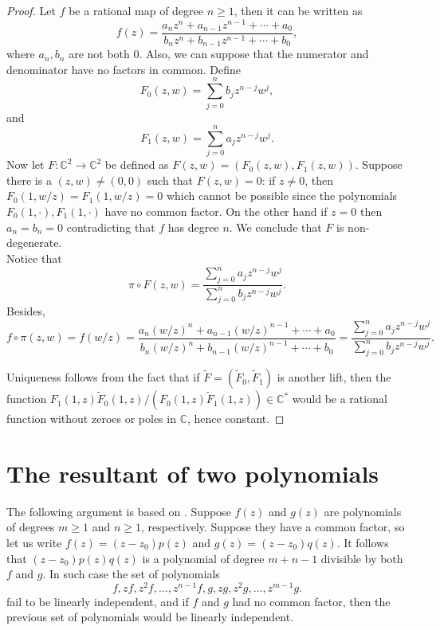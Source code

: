 \begin{proof}
Let $f$ be a rational map of degree $n\geq 1$, then it can be written as
$$f(z) = \frac{a_nz^n +a_{n-1}z^{n-1}+\cdots + a_0}{b_nz^n+b_{n-1}z^{n-1}+\cdots+b_0},$$
where $a_n,b_n$ are not both $0$. Also, we can suppose that the numerator and denominator have no factors in common. Define
$$F_0(z,w) = \sum_{j=0}^n b_jz^{n-j}w^j,$$
and
$$F_1(z,w) = \sum_{j=0}^n a_jz^{n-j}w^j.$$
Now let $F:\mathbb{C}^2 \rightarrow \mathbb{C}^2$ be defined as $F(z,w) = (F_0(z,w),F_1(z,w))$. Suppose there is a $(z,w) \neq (0,0)$ such that $F(z,w)=0$: if $z\neq 0$, then $F_0(1,w/z) = F_1(1,w/z)=0$ which cannot be possible since the polynomials $F_0(1,\cdot),F_1(1,\cdot)$ have no common factor. On the other hand if $z=0$ then $a_n=b_n=0$ contradicting that $f$ has degree $n$. We conclude that $F$ is non-degenerate.\\

Notice that
$$\pi \circ F (z,w) = \frac{\sum_{j=0}^n a_j z^{n-j}w^j}{\sum_{j=0}^n b_j z^{n-j}w^j}.$$
Besides,
$$f\circ \pi (z,w) = f(w/z) = \frac{a_n(w/z)^n +a_{n-1}(w/z)^{n-1}+\cdots + a_0}{b_n(w/z)^n+b_{n-1}(w/z)^{n-1}+\cdots+b_0} = \frac{\sum_{j=0}^n a_j z^{n-j}w^j}{\sum_{j=0}^n b_j z^{n-j}w^j}.$$

Uniqueness follows from the fact that if $\tilde{F}=(\tilde{F}_0,\tilde{F}_1)$ is another lift, then the function $F_1(1,z)\tilde{F}_0(1,z)/(F_0(1,z)\tilde{F}_1(1,z))\in \mathbb{C}^*$ would be a rational function without zeroes or poles in $\mathbb{C}$, hence constant.
\end{proof}

\section{The resultant of two polynomials}\label{appendixresultant}
The following argument is based on \cite{harris}. Suppose $f(z)$ and $g(z)$ are polynomials of degrees $m\geq 1$ and $n\geq 1$, respectively. Suppose they have a common factor, so let us write $f(z)=(z-z_0)p(z)$ and $g(z)=(z-z_0)q(z)$. It follows that $(z-z_0)p(z)q(z)$ is a polynomial of degree $m+n-1$ divisible by both $f$ and $g$. In such case the set of polynomials 
\begin{equation}\label{01polinos}
f,zf,z^2f,\dots,z^{n-1}f,g,zg,z^2g,\dots,z^{m-1}g.
\end{equation}
fail to be linearly independent, and if $f$ and $g$ had no common factor, then the previous set of polynomials would be linearly independent.\\

